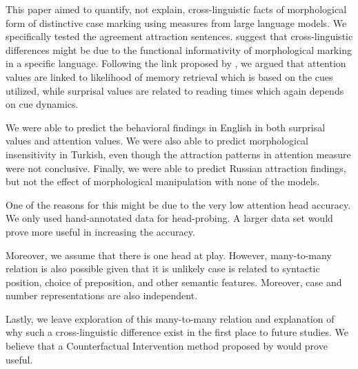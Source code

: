 \documentclass[10pt,letterpaper]{article}
\begin{document}
This paper aimed to quantify, not explain, cross-linguistic facts of morphological form of distinctive case marking using measures from large language models. We specifically tested the agreement attraction sentences.  suggest that cross-linguistic differences might be due to the functional informativity of morphological marking in a specific language. Following the link proposed by , we argued that attention values are linked to likelihood of memory retrieval which is based on the cues utilized, while surprisal values are related to reading times which again depends on cue dynamics. 

We were able to predict the behavioral findings in English in both surprisal values and attention values. We were also able to predict morphological insensitivity in Turkish, even though the attraction patterns in attention measure were not conclusive. Finally, we were able to predict Russian attraction findings, but not the effect of morphological manipulation with none of the models. 

One of the reasons for this might be due to the very low attention head accuracy. We only used hand-annotated data for head-probing. A larger data set would prove more useful in increasing the accuracy.

Moreover, we assume that there is one head at play. However, many-to-many relation is also possible given that it is unlikely case is related to syntactic position, choice of preposition, and other semantic features. Moreover, case and number representations are also independent.

Lastly, we leave exploration of this many-to-many relation and explanation of why such a cross-linguistic difference exist in the first place to future studies. We believe that a Counterfactual Intervention method proposed by  would prove useful.









\setlength{\bibleftmargin}{.125in}
\setlength{\bibindent}{-\bibleftmargin}


\end{document}
